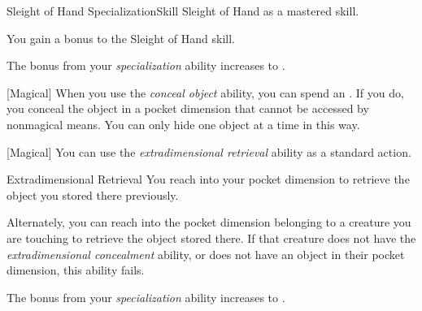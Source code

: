     \begin{feat}{Sleight of Hand Specialization}{Skill}
        \featpre Sleight of Hand as a mastered skill.

         You gain a  bonus to the Sleight of Hand skill.

        \ff[2]{}

         The bonus from your \textit{specialization} ability increases to .

        [Magical] When you use the \textit{conceal object} ability, you can spend an .
        If you do, you conceal the object in a pocket dimension that cannot be accessed by nonmagical means.
        You can only hide one object at a time in this way.

        [Magical] You can use the \textit{extradimensional retrieval} ability as a standard action.
        \begin{apability}{Extradimensional Retrieval}
            You reach into your pocket dimension to retrieve the object you stored there previously.

            Alternately, you can reach into the pocket dimension belonging to a creature you are touching to retrieve the object stored there.
            If that creature does not have the \textit{extradimensional concealment} ability, or does not have an object in their pocket dimension, this ability fails.
        \end{apability}

         The bonus from your \textit{specialization} ability increases to .
    \end{feat}

